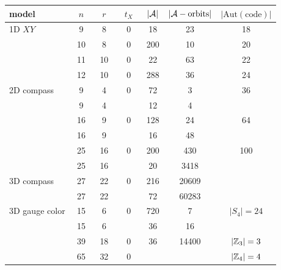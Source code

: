\begin{center}
\begin{tabular}{ l|c|c|c|c|c|c } 
model &\ $n$\ &\ $r$\ &\ $t_X$\ & $|\mathcal{A}|$ & $|\mathcal{A}-\mathrm{orbits}|$ & 
$|\mathrm{Aut(code)}|$ \\
\hline
  1D $XY$ & 9 &  8& 0   & 18 & 23 & 18  \\
        & 10 & 8& 0   & 200 & 10 & 20  \\
        & 11 & 10 & 0 & 22 & 63 & 22  \\
        & 12 & 10 & 0 & 288 & 36 & 24  \\
\hline
    2D compass & 9 & 4 & 0 & 72 & 3 & 36 \\
            & 9 & 4 &    & 12 & 4 &  \\
            & 16 & 9  & 0 & 128 & 24 & 64 \\
            & 16 & 9  &    & 16 & 48 &  \\
            & 25 & 16 & 0 & 200 & 430 & 100 \\
            & 25 & 16 &    & 20  & 3418 &  \\
\hline
    3D compass & 27 & 22 & 0     & 216  & 20609  &     \\
               & 27 & 22 &    &  72 & 60283   &  \\
\hline
    3D gauge color & 15 & 6  & 0 & 720 & 7 & $|S_4|=24$ \\
                & 15 & 6  &  & 36 & 16 &  \\
                & 39 & 18 & 0 & 36 & 14400 & $|\mathbb{Z}_3|=3$  \\
                & 65 & 32 & 0 &    &       & $|\mathbb{Z}_4|=4$ \\
\end{tabular}
\end{center}

